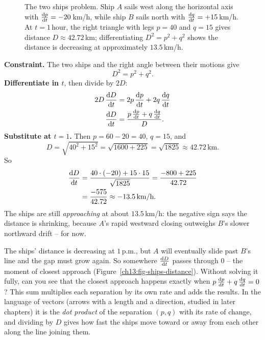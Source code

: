 \begin{example}
\begin{figure}[H]
\caption{The two ships problem. Ship $A$ sails west along the horizontal
axis with $\frac{\mathrm{d} p}{\mathrm{d} t} = -20$\,km/h, while ship $B$ sails north with $\frac{\mathrm{d} q}{\mathrm{d} t} = +15$\,km/h. At $t=1$\,hour,
the right triangle with legs $p=40$ and $q=15$ gives distance $D\approx 42.72$\,km; differentiating
$D^2 = p^2 + q^2$ shows the distance is decreasing at approximately $13.5$\,km/h.}
\label{ch13:fig-ships}
\end{figure}

\textbf{Constraint.} The two ships and the right angle between their motions give
\[
D^2 = p^2 + q^2.
\]
\textbf{Differentiate in $t$}, then divide by $2D$:
\begin{align*}
2D\,\frac{\mathrm{d} D}{\mathrm{d} t} &= 2p\,\frac{\mathrm{d} p}{\mathrm{d} t} + 2q\,\frac{\mathrm{d} q}{\mathrm{d} t} \\
\frac{\mathrm{d} D}{\mathrm{d} t} &= \frac{p\,\frac{\mathrm{d} p}{\mathrm{d} t} + q\,\frac{\mathrm{d} q}{\mathrm{d} t}}{D}.
\end{align*}
\textbf{Substitute at $t=1$.} Then $p = 60-20 = 40$, $q = 15$, and
\[
D = \sqrt{40^2 + 15^2} = \sqrt{1600 + 225} = \sqrt{1825} \approx 42.72\,\text{km}.
\]
So
\begin{align*}
\frac{\mathrm{d} D}{\mathrm{d} t} &= \frac{40\cdot(-20) + 15\cdot 15}{\sqrt{1825}} = \frac{-800 + 225}{42.72} \\
&= \frac{-575}{42.72}\approx -13.5\,\text{km/h}.
\end{align*}
The ships are still \emph{approaching} at about $13.5$\,km/h: the negative sign says the distance is
shrinking, because $A$'s rapid westward closing outweighs $B$'s slower northward drift -- for now.
\end{example}

\begin{walkbox}
The ships' distance is decreasing at $1$\,p.m., but $A$ will eventually slide past $B$'s line and the
gap must grow again. So somewhere $\frac{\mathrm{d} D}{\mathrm{d} t}$ passes through $0$ -- the moment of closest approach
(Figure~\ref{ch13:fig-ships-distance}).
Without solving it fully, can you see that the closest approach happens exactly when $p\,\frac{\mathrm{d} p}{\mathrm{d} t} +
q\,\frac{\mathrm{d} q}{\mathrm{d} t} = 0$? This sum multiplies each separation by its own rate and adds the results. In the
language of vectors (arrows with a length and a direction, studied in later chapters) it is the
\emph{dot product} of the separation $(p,q)$ with its rate of change, and dividing by $D$ gives
how fast the ships move toward or away from each other along the line joining them.
\end{walkbox}

